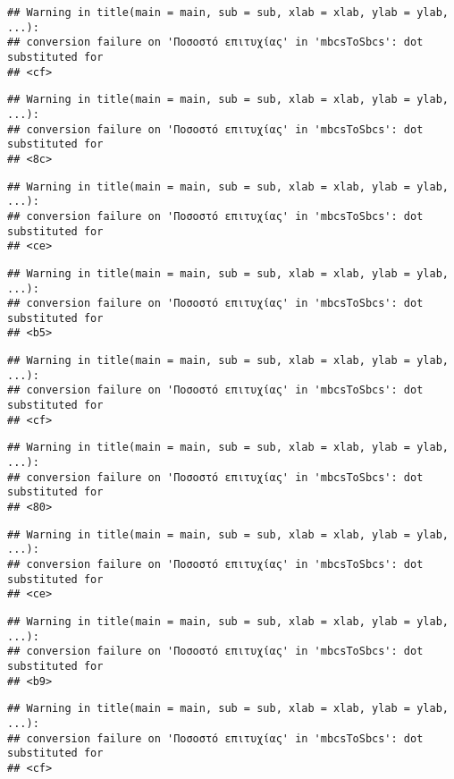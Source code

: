 \documentclass[
]{article}
\begin{document}
\begin{verbatim}
## Warning in title(main = main, sub = sub, xlab = xlab, ylab = ylab, ...):
## conversion failure on 'Ποσοστό επιτυχίας' in 'mbcsToSbcs': dot substituted for
## <cf>
\end{verbatim}

\begin{verbatim}
## Warning in title(main = main, sub = sub, xlab = xlab, ylab = ylab, ...):
## conversion failure on 'Ποσοστό επιτυχίας' in 'mbcsToSbcs': dot substituted for
## <8c>
\end{verbatim}

\begin{verbatim}
## Warning in title(main = main, sub = sub, xlab = xlab, ylab = ylab, ...):
## conversion failure on 'Ποσοστό επιτυχίας' in 'mbcsToSbcs': dot substituted for
## <ce>
\end{verbatim}

\begin{verbatim}
## Warning in title(main = main, sub = sub, xlab = xlab, ylab = ylab, ...):
## conversion failure on 'Ποσοστό επιτυχίας' in 'mbcsToSbcs': dot substituted for
## <b5>
\end{verbatim}

\begin{verbatim}
## Warning in title(main = main, sub = sub, xlab = xlab, ylab = ylab, ...):
## conversion failure on 'Ποσοστό επιτυχίας' in 'mbcsToSbcs': dot substituted for
## <cf>
\end{verbatim}

\begin{verbatim}
## Warning in title(main = main, sub = sub, xlab = xlab, ylab = ylab, ...):
## conversion failure on 'Ποσοστό επιτυχίας' in 'mbcsToSbcs': dot substituted for
## <80>
\end{verbatim}

\begin{verbatim}
## Warning in title(main = main, sub = sub, xlab = xlab, ylab = ylab, ...):
## conversion failure on 'Ποσοστό επιτυχίας' in 'mbcsToSbcs': dot substituted for
## <ce>
\end{verbatim}

\begin{verbatim}
## Warning in title(main = main, sub = sub, xlab = xlab, ylab = ylab, ...):
## conversion failure on 'Ποσοστό επιτυχίας' in 'mbcsToSbcs': dot substituted for
## <b9>
\end{verbatim}

\begin{verbatim}
## Warning in title(main = main, sub = sub, xlab = xlab, ylab = ylab, ...):
## conversion failure on 'Ποσοστό επιτυχίας' in 'mbcsToSbcs': dot substituted for
## <cf>
\end{verbatim}
\end{document}
